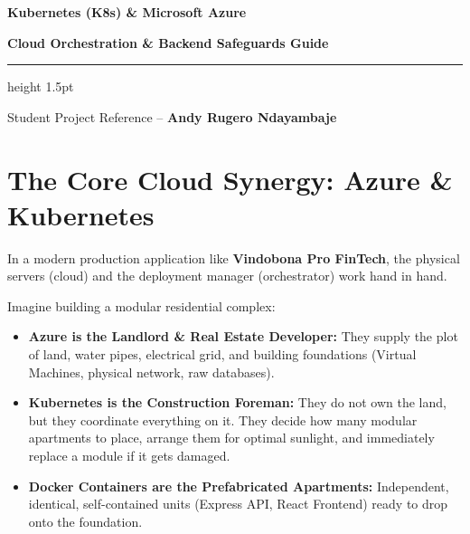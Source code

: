 \documentclass[11pt,a4paper]{article}
\begin{document}

\begin{tcolorbox}[
    colback=primarynavy,
    colframe=accentblue,
    arc=8pt,
    boxrule=2.5pt,
    left=20pt,
    right=20pt,
    top=25pt,
    bottom=25pt,
    coltext=white
]
    \centering
    {\huge\bfseries Kubernetes (K8s) \& Microsoft Azure \par}
    \vspace{8pt}
    {\Large\bfseries Cloud Orchestration \& Backend Safeguards Guide \par}
    \vspace{10pt}
    \color{accentcyan}\hrule height 1.5pt
    \vspace{8pt}
    {\small Student Project Reference -- \textbf{Andy Rugero Ndayambaje} \par}
\end{tcolorbox}

\section{The Core Cloud Synergy: Azure \& Kubernetes}

In a modern production application like \textbf{Vindobona Pro FinTech}, the physical servers (cloud) and the deployment manager (orchestrator) work hand in hand.

\begin{tcolorbox}[
    colback=bglight,
    colframe=accentorange,
    arc=6pt,
    boxrule=1.5pt,
    title=\textbf{\color{white}💡 The Real-World Analogy}
]
    Imagine building a modular residential complex:
    \begin{itemize}
        \item \textbf{Azure is the Landlord \& Real Estate Developer:} They supply the plot of land, water pipes, electrical grid, and building foundations (Virtual Machines, physical network, raw databases).
        \item \textbf{Kubernetes is the Construction Foreman:} They do not own the land, but they coordinate everything on it. They decide how many modular apartments to place, arrange them for optimal sunlight, and immediately replace a module if it gets damaged.
        \item \textbf{Docker Containers are the Prefabricated Apartments:} Independent, identical, self-contained units (Express API, React Frontend) ready to drop onto the foundation.
    \end{itemize}
\end{tcolorbox}
\end{document}
